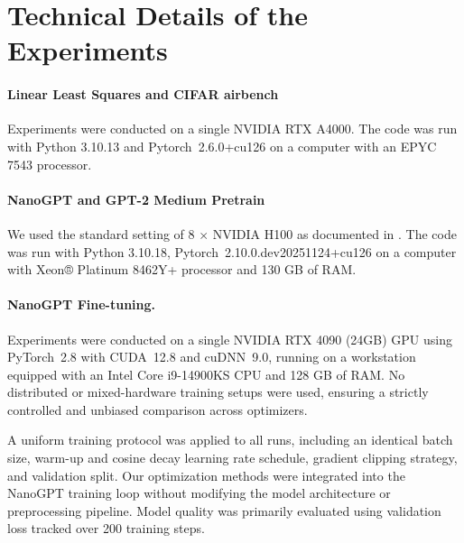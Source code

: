 \documentclass[pmlr]{jmlr}%
\begin{document}
 \section{Technical Details of the Experiments}
 
 \paragraph{Linear Least Squares and CIFAR airbench} Experiments were conducted on a single NVIDIA RTX A4000. The code was run with Python 3.10.13 and Pytorch~2.6.0+cu126 on a computer with an EPYC 7543 processor.
 
 \paragraph{NanoGPT and GPT-2 Medium Pretrain} We used the standard setting of 8 $\times$ NVIDIA H100 as documented in \citep{modded_nanogpt_2024}. The code was run with Python 3.10.18, Pytorch~2.10.0.dev20251124+cu126 on a computer with Xeon® Platinum 8462Y+ processor and 130 GB of RAM.
 
 \paragraph{NanoGPT Fine-tuning.} Experiments were conducted on a single NVIDIA RTX 4090 (24GB) GPU using PyTorch~2.8 with CUDA~12.8 and cuDNN~9.0, running on a workstation equipped with an Intel Core i9-14900KS CPU and 128 GB of RAM. No distributed or mixed-hardware training setups were used, ensuring a strictly controlled and unbiased comparison across optimizers.
 
 A uniform training protocol was applied to all runs, including an identical batch size, warm-up and cosine decay learning rate schedule, gradient clipping strategy, and validation split. Our optimization methods were integrated into the NanoGPT training loop without modifying the model architecture or preprocessing pipeline. Model quality was primarily evaluated using validation loss tracked over 200 training steps.
 
 
\end{document}
